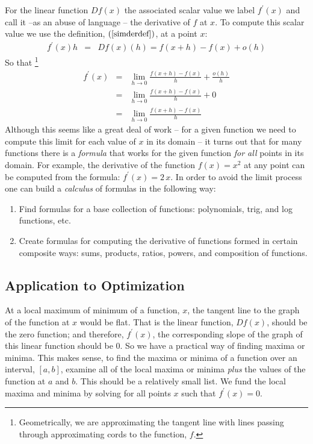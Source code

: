 \documentclass{article}
\begin{document}
For the linear function $Df(x)$ the associated scalar value we label $f^\prime(x)$
and call it --as an abuse of language -- the derivative of $f$ at $x$.
To compute this scalar value we use the definition, $(\ref{simderdef})$, at a point $x$:
\begin{eqnarray}
  f^\prime(x) h & = & Df(x)(h) = f(x+h) - f(x) + o(h)
\end{eqnarray}
So that%
\footnote{Geometrically, we are approximating the tangent line with lines passing
through approximating cords to the function, $f$.}
\begin{eqnarray}
  f^\prime(x) & = & \lim_{h \rightarrow 0} \frac{f(x+h) - f(x)}{h} + \frac{o(h)}{h} \nonumber \\
  & = & \lim_{h \rightarrow 0} \frac{f(x+h) - f(x)}{h} + 0 \nonumber \\
  & = & \lim_{h \rightarrow 0} \frac{f(x+h) - f(x)}{h}
\end{eqnarray}
Although this seems like a great deal of work -- for a given function we need to
compute this limit for each value of $x$ in its domain -- it turns out that for
many functions there is a {\em formula\/} that works for the given function
{\em for all\/}
points in its domain. For example, the derivative of the
function $f(x) = x^2$ at any point can be computed from the formula:
$f^\prime(x) = 2\, x$. In order to avoid the limit process one can build a
{\em calculus\/} of formulas in the following way:
\begin{enumerate}
\item{Find formulas for a base collection of functions: polynomials, trig, and log
functions, etc.}
\item{Create formulas for computing the derivative of functions formed in certain
composite ways: sums, products, ratios, powers, and composition of functions.}
\end{enumerate}

\subsection{Application to Optimization}
At a local maximum of minimum of a function, $x$, the tangent line to
the graph of the function at $x$ would be flat. That is the linear function, $Df(x)$,
should be the zero function; and therefore, $f^\prime(x)$, the corresponding
slope of the graph of this linear function should be $0$.
So we have a practical way of finding maxima or minima.
This makes sense, to find the maxima or minima of a function over an interval, $[a,b]$,
examine all of the local maxima or minima {\em plus\/} the values of the function
at $a$ and $b$. This should be a relatively small list. We fund the local maxima
and minima by solving for all points $x$ such that $f^\prime(x) = 0$.
\end{document}
